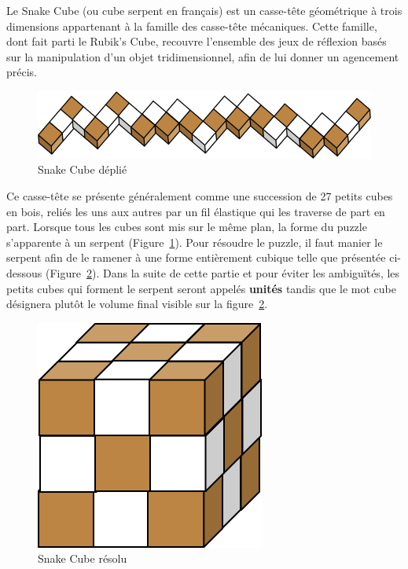 Le Snake Cube (ou cube serpent en français) est un casse-tête géométrique à trois dimensions appartenant à la famille des casse-tête mécaniques. Cette famille, dont fait parti le Rubik’s Cube, recouvre l’ensemble des jeux de réflexion basés sur la manipulation d’un objet tridimensionnel, afin de lui donner un agencement précis.


\begin{figure}[h]
 \centering
 \includegraphics[scale=0.5,keepaspectratio=true]{img/snakeCubeFlat.png}
 \caption{Snake Cube déplié}
 \label{snakeFlat}
\end{figure}

Ce casse-tête se présente généralement comme une succession de 27 petits cubes en bois, reliés les uns aux autres par un fil élastique qui les traverse de part en part. Lorsque tous les cubes sont mis sur le même plan, la forme du puzzle s’apparente à un serpent  (Figure~\ref{snakeFlat}). Pour résoudre le puzzle, il faut manier le serpent afin de le ramener à une forme entièrement cubique telle que présentée ci-dessous (Figure~\ref{snakeSolved}). Dans la suite de cette partie et pour éviter les ambiguïtés, les petits cubes qui forment le serpent seront appelés \textbf{unités} tandis que le mot cube désignera plutôt le volume final visible sur la figure~\ref{snakeSolved}.

\begin{figure}[h]
 \centering
 \includegraphics[scale=0.5,keepaspectratio=true]{img/snakeCubeSolved.png}
 \caption{Snake Cube résolu}
 \label{snakeSolved}
\end{figure}

